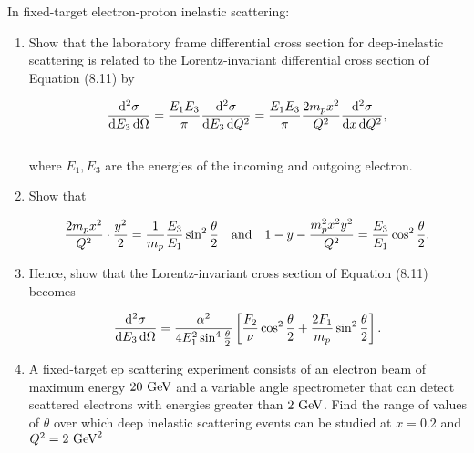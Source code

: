 \begin{problem}{8.3}
    In fixed-target electron-proton inelastic scattering:
    \begin{enumerate}[label=(\alph*)]
        \item Show that the laboratory frame differential cross section for deep-inelastic scattering is related to the Lorentz-invariant differential cross section of Equation (8.11) by
        
        \begin{align*}
            \frac{\dif^2 \sigma}{\dif E_3 \dif \Omega} = \frac{E_1E_3}{\pi} \frac{\dif^2 \sigma}{\dif E_3 \dif Q^2} =  \frac{E_1E_3}{\pi} \frac{2m_px^2}{Q^2} \frac{\dif^2 \sigma}{\dif x \dif Q^2},
        \end{align*}\\
        where $E_1,E_3$ are the energies of the incoming and outgoing electron. 

        \item Show that
        
        \begin{align*}
            \frac{2m_p x^2}{Q^2} \cdot \frac{y^2}{2} = \frac{1}{m_p} \frac{E_3}{E_1} \sin^2 \frac{\theta}{2} \quad \text{and} \quad 1-y-\frac{m_p^2x^2y^2}{Q^2} = \frac{E_3}{E_1} \cos^2 \frac{\theta}{2}.
        \end{align*}

        \item Hence, show that the Lorentz-invariant cross section of Equation (8.11) becomes
        
        \begin{align*}
            \frac{\mathop{}\!\mathrm{d}^2 \sigma}{\mathop{}\!\mathrm{d} E_3 \mathop{}\!\mathrm{d} \Omega} = \frac{\alpha^2}{4E_1^2 \sin^4 \frac{\theta}{2}} \left[ \frac{F_2}{\nu}\cos^2\frac{\theta}{2} + \frac{2F_1}{m_p} \sin^2 \frac{\theta}{2} \right].
        \end{align*}

        \item A fixed-target ep scattering experiment consists of an electron beam of maximum energy $20 \text{ GeV}$ and a variable angle spectrometer that can detect scattered electrons with energies greater than $2 \text{ GeV}$. Find the range of values of $\theta$ over which deep inelastic scattering events can be studied at $x = 0.2$ and $Q^2 = 2 \text{ GeV}^2$
    \end{enumerate}
\end{problem}
